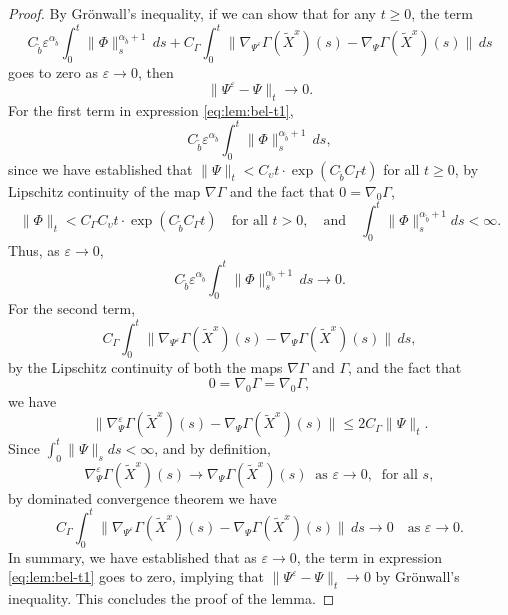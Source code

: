 \documentclass[11pt]{article}
\theoremstyle{definition}
\theoremstyle{plain}
\newcommand{\tb}{\tilde{b}}
\newcommand{\veps}{\varepsilon}
\begin{document}
\begin{appendices}
\begin{proof}
By Grönwall’s inequality, if we can show that for any \( t \geq 0 \), the term 
\begin{equation}\label{eq:lem:bel-t1}
C_{\tb}\veps^{\alpha_{\tb}} \int_0^t \| \Phi \|_s^{{\alpha_{\tb}}+1}\,ds + C_\Gamma \int_0^t \| \nabla_{\Psi^\varepsilon} \Gamma(\tilde{X}^x)(s) - \nabla_{\Psi} \Gamma(\tilde{X}^x)(s) \|\,ds
\end{equation}
goes to zero as \( \varepsilon \to 0 \), then
\[
\| \Psi^\varepsilon - \Psi \|_t \to 0.
\]
For the first term in expression \eqref{eq:lem:bel-t1},
\[
C_{\tb}\veps^{\alpha_{\tb}} \int_0^t \| \Phi \|_s^{{\alpha_{\tb}}+1}\,ds,
\]
since we have established that \( \| \Psi \|_t < C_\upsilon t \cdot \exp \left(C_{\tb} C_\Gamma t\right) \) for all \( t \geq 0 \),  
by Lipschitz continuity of the map \( \nabla \Gamma \) and the fact that \( 0 = \nabla_0 \Gamma \),  
\[
\| \Phi \|_t < C_\Gamma C_\upsilon t \cdot \exp \left(C_{\tb} C_\Gamma t\right) \quad \text{for all } t > 0, \quad \text{and} \quad \int_0^t \| \Phi \|_s^{{\alpha_{\tb}}+1} ds < \infty.
\]
Thus, as \( \varepsilon \to 0 \),
\[
C_{\tb}\veps^{\alpha_{\tb}} \int_0^t \| \Phi \|_s^{{\alpha_{\tb}}+1}\,ds \to 0.
\]
For the second term,
\[
C_\Gamma \int_0^t \| \nabla_{\Psi^\varepsilon} \Gamma(\tilde{X}^x)(s) - \nabla_{\Psi} \Gamma(\tilde{X}^x)(s) \|\,ds,
\]
by the Lipschitz continuity of both the maps \( \nabla \Gamma \) and \( \Gamma \), and the fact that  
\[
0 = \nabla_0 \Gamma = \nabla_0 \Gamma,
\]
we have
\[
\| \nabla^\veps_{\Psi} \Gamma(\tilde{X}^x)(s) - \nabla_{\Psi} \Gamma(\tilde{X}^x)(s) \| \le 2 C_\Gamma \| \Psi \|_t.
\]
Since \( \int_0^t \| \Psi \|_s ds < \infty \), and by definition,
\[
\nabla^\veps_{\Psi} \Gamma(\tilde{X}^x)(s) \to \nabla_{\Psi} \Gamma(\tilde{X}^x)(s) \ \text{ as } \veps \to 0, \ \text{ for all } s, 
\]
by dominated convergence theorem we have
\[
C_\Gamma \int_0^t \| \nabla_{\Psi^\varepsilon} \Gamma(\tilde{X}^x)(s) - \nabla_{\Psi} \Gamma(\tilde{X}^x)(s) \|\,ds \to 0
\quad \text{as } \varepsilon \to 0.
\]
In summary, we have established that as $\veps \to 0$, the term in expression \eqref{eq:lem:bel-t1} goes to zero, implying that 
$\| \Psi^\varepsilon - \Psi \|_t \to 0$ by Grönwall's inequality. This concludes the proof of the lemma.
\end{proof}



\end{appendices}
\end{document}
